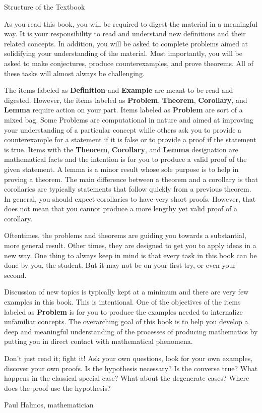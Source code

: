 \begin{section}{Structure of the Textbook}

As you read this book, you will be required to digest the material in a meaningful way.  It is your responsibility to read and understand new definitions and their related concepts.  In addition, you will be asked to complete problems aimed at solidifying your understanding of the material.  Most importantly, you will be asked to make conjectures, produce counterexamples, and prove theorems. All of these tasks will almost always be challenging.

The items labeled as \textbf{Definition} and \textbf{Example} are meant to be read and digested.  However, the items labeled as \textbf{Problem}, \textbf{Theorem}, \textbf{Corollary}, and \textbf{Lemma} require action on your part.  Items labeled as \textbf{Problem} are sort of a mixed bag. Some Problems are computational in nature and aimed at improving your understanding of a particular concept while others ask you to provide a counterexample for a statement if it is false or to provide a proof if the statement is true. Items with the \textbf{Theorem}, \textbf{Corollary}, and \textbf{Lemma} designation are mathematical facts and the intention is for you to produce a valid proof of the given statement.  A lemma is a minor result whose sole purpose is to help in proving a theorem. The main difference between a theorem and a corollary is that corollaries are typically statements that follow quickly from a previous theorem.  In general, you should expect corollaries to have very short proofs.  However, that does not mean that you cannot produce a more lengthy yet valid proof of a corollary.

Oftentimes, the problems and theorems are guiding you towards a substantial, more  general result. Other times, they are designed to get you to apply ideas in a new way. One thing to always keep in mind is that every task in this book can be done by you, the student. But it may not be on your first try, or even your second.

Discussion of new topics is typically kept at a minimum and there are very few examples in this book. This is intentional.  One of the objectives of the items labeled as \textbf{Problem} is for you to produce the examples needed to internalize unfamiliar concepts.  The overarching goal of this book is to help you develop a deep and meaningful understanding of the processes of producing mathematics by putting you in direct contact with mathematical phenomena.

\epigraph{Don't just read it; fight it! Ask your own questions, look for your own examples, discover your own proofs. Is the hypothesis necessary? Is the converse true? What happens in the classical special case? What about the degenerate cases? Where does the proof use the hypothesis?}{Paul Halmos, mathematician}

\end{section}

